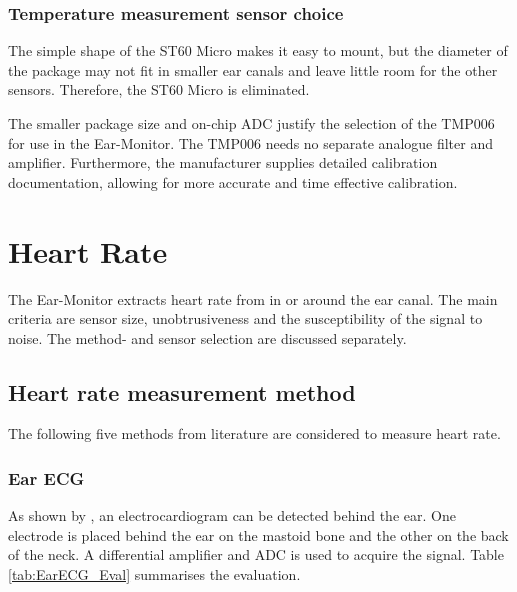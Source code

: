 \subsubsection{Temperature measurement sensor choice}
The simple shape of the ST60 Micro makes it easy to mount, but the diameter of the package may not fit in smaller ear canals and leave little room for the other sensors. Therefore, the ST60 Micro is eliminated.

\medskip

The smaller package size and on-chip ADC justify the selection of the TMP006 for use in the Ear-Monitor. The TMP006 needs no separate analogue filter and amplifier. Furthermore, the manufacturer supplies detailed calibration documentation, allowing for more accurate and time effective calibration.

\section{Heart Rate}
The Ear-Monitor extracts heart rate from in or around the ear canal. The main criteria are sensor size, unobtrusiveness and the susceptibility of the signal to noise. The method- and sensor selection are discussed separately. 

\subsection{Heart rate measurement method}

The following five methods from literature are considered to measure heart rate.

\subsubsection{Ear ECG}

As shown by \cite{winokur2012wearable}, an electrocardiogram can be detected behind the ear. One electrode is placed behind the ear on the mastoid bone and the other on the back of the neck. A differential amplifier and ADC is used to acquire the signal. Table \ref{tab:EarECG_Eval} summarises the evaluation.

